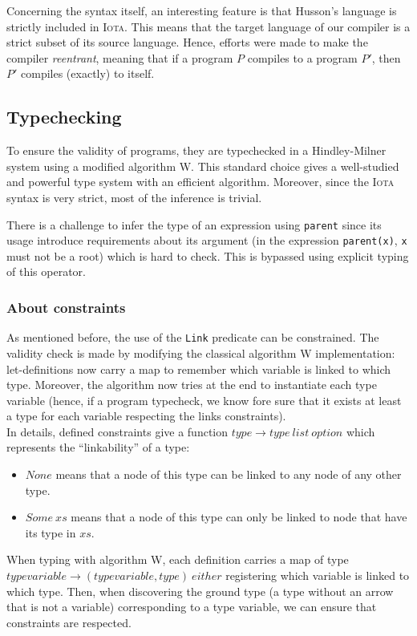 \documentclass[10pt,a4paper]{article}
\newcommand\Iota{\textsc{Iota}}
\newcommand{\ocaml}{\texttt}
\begin{document}
Concerning the syntax itself, an interesting feature is that Husson's language is strictly included in \Iota{}. This means that the target language of our compiler is a strict subset of its source language. Hence, efforts were made to make the compiler \emph{reentrant}, meaning that if a program $P$ compiles to a program $P'$, then $P'$ compiles (exactly) to itself.

\subsection{Typechecking}
To ensure the validity of programs, they are typechecked in a Hindley-Milner system\cite{hindley} using a modified algorithm W\cite{milner}.
This standard choice gives a well-studied and powerful type system with an efficient algorithm. Moreover, since the \Iota{} syntax is very strict, most of the inference is trivial.

There is a challenge to infer the type of an expression using \ocaml{parent} since its usage introduce requirements about its argument (in the expression \ocaml{parent(x)}, \ocaml{x} must not be a root) which is hard to check. This is bypassed using explicit typing of this operator.

\subsubsection{About constraints}
As mentioned before, the use of the \ocaml{Link} predicate can be constrained. The validity check is made by modifying the classical algorithm W implementation: let-definitions now carry a map to remember which variable is linked to which type. Moreover, the algorithm now tries at the end to instantiate each type variable (hence, if a program typecheck, we know fore sure that it exists at least a type for each variable respecting the links constraints).\\

In details, defined constraints give a function $type \to type\ list\ option$ which represents the ``linkability'' of a type:
\begin{itemize}
\item $None$ means that a node of this type can be linked to any node of any other type.
\item $Some\ xs$ means that a node of this type can only be linked to node that have its type in $xs$.
\end{itemize}
When typing with algorithm W, each definition carries a map of type $typevariable \to (typevariable, type)\ either$ registering which variable is linked to which type. Then, when discovering the ground type (a type without an arrow that is not a variable) corresponding to a type variable, we can ensure that constraints are respected.
\end{document}
